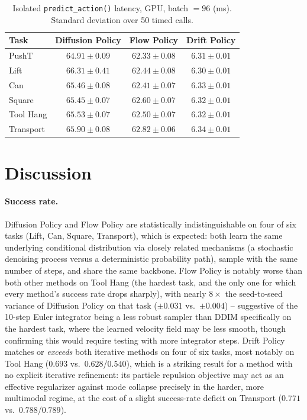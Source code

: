 \documentclass[11pt]{article}
\begin{document}
\begin{table}[H]
\centering
\caption{Isolated \texttt{predict\_action()} latency, GPU, batch $=96$ (ms). Standard deviation over 50 timed calls.}
\label{tab:latency}
\begin{tabular}{lccc}
\toprule
Task & Diffusion Policy & Flow Policy & Drift Policy \\
\midrule
PushT      & $64.91 \pm 0.09$ & $62.33 \pm 0.08$ & $6.31 \pm 0.01$ \\
Lift       & $66.31 \pm 0.41$ & $62.44 \pm 0.08$ & $6.30 \pm 0.01$ \\
Can        & $65.46 \pm 0.08$ & $62.41 \pm 0.07$ & $6.33 \pm 0.01$ \\
Square     & $65.45 \pm 0.07$ & $62.60 \pm 0.07$ & $6.32 \pm 0.01$ \\
Tool Hang  & $65.53 \pm 0.07$ & $62.50 \pm 0.07$ & $6.32 \pm 0.01$ \\
Transport  & $65.90 \pm 0.08$ & $62.82 \pm 0.06$ & $6.34 \pm 0.01$ \\
\bottomrule
\end{tabular}
\end{table}

\section{Discussion}
\label{sec:discussion}

\paragraph{Success rate.} Diffusion Policy and Flow Policy are statistically
indistinguishable on four of six tasks (Lift, Can, Square, Transport), which
is expected: both learn the same underlying conditional distribution via
closely related mechanisms (a stochastic denoising process versus a
deterministic probability path), sample with the same number of steps, and
share the same backbone. Flow Policy is notably worse than both other
methods on Tool Hang (the hardest task, and the only one for which every
method's success rate drops sharply), with nearly $8\times$ the
seed-to-seed variance of Diffusion Policy on that task ($\pm0.031$ vs.\
$\pm0.004$) -- suggestive of the 10-step Euler integrator being a less
robust sampler than DDIM specifically on the hardest task, where the learned
velocity field may be less smooth, though confirming this would require
testing with more integrator steps. Drift Policy matches or \emph{exceeds}
both iterative methods on four of six tasks, most notably on Tool Hang
($0.693$ vs.\ $0.628$/$0.540$), which is a striking result for a method with
no explicit iterative refinement: its particle repulsion objective may act
as an effective regularizer against mode collapse precisely in the
harder, more multimodal regime, at the cost of a slight success-rate deficit
on Transport ($0.771$ vs.\ $0.788$/$0.789$).
\end{document}
